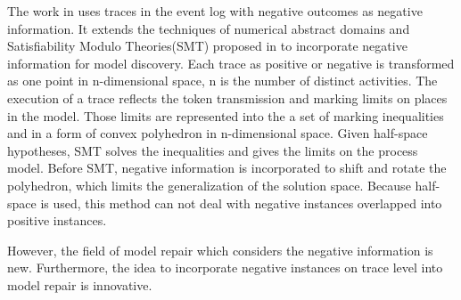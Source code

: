 The work in \cite{ponce2016incorporating} uses traces in the event log with negative outcomes as negative information. It extends the techniques of numerical abstract domains and Satisfiability Modulo Theories(SMT) proposed in \cite{carmona2014process} to incorporate negative information for model discovery. Each trace  as positive or negative is transformed as one point in n-dimensional space, n is the number of distinct activities. The execution of a trace reflects the token transmission and marking limits on places in the model. Those limits are represented into the a set of marking inequalities and in a form of convex polyhedron in n-dimensional space. Given half-space hypotheses, SMT solves the inequalities and gives the limits on the process model. Before SMT, negative information is incorporated to shift and rotate the polyhedron, which limits the generalization of the solution space. Because half-space is used, this method can not deal with negative instances overlapped into positive instances.


However, the field of model repair which considers the negative information is new. Furthermore, the idea to incorporate negative instances on trace level into model repair is innovative.  

\iffalse
Compared to this, our approach is innovative mainly in the following aspects. 
\begin{itemize}
	\item Incorporate the negative information into model repair. 
	\item Analyze the long-term dependency in the model to provide a preciser result. 
	\item Analyze Model on Trace level. All activities constituting a trace are considered. 
\end{itemize}
\fi